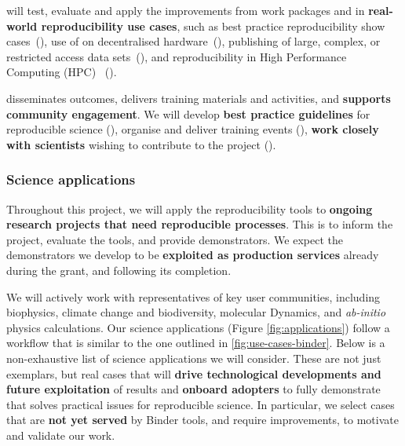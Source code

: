  will test, evaluate and apply the improvements from
work packages  and  in \textbf{real-world
reproducibility use cases}, such as best practice reproducibility show
cases~(), use of \repotodocker{} on
decentralised hardware~(), publishing
of large, complex, or restricted access data
sets~(), and reproducibility in High Performance Computing (HPC)~
().

 disseminates outcomes, delivers training materials
and activities, and \textbf{supports community engagement}. We will develop \textbf{best practice guidelines} for reproducible
science (), organise and deliver
training events (), \textbf{work closely with
scientists} wishing to contribute to the project ().

\subsubsection{Science applications}\label{sec:science-applications}

Throughout this project, we will apply the reproducibility tools to \textbf{ongoing
research projects that need reproducible processes}. This is to inform the
project, evaluate the tools, and provide demonstrators. We expect the
demonstrators we develop to be \textbf{exploited as production services} already during
the grant, and following its completion.

We will actively work with representatives of key user communities, including biophysics,
climate change and biodiversity, molecular Dynamics, and \emph{ab-initio} physics calculations.
Our science applications (Figure \ref{fig:applications}) follow a workflow that is similar to the one
outlined in \ref{fig:use-cases-binder}.
Below is a non-exhaustive list of science applications we will consider. These are not just exemplars, but
real cases that will \textbf{drive technological developments and future exploitation} of \TheProject results
 and \textbf{onboard adopters} to fully demonstrate that \TheProject
solves practical issues for reproducible science.
In particular, we select cases that are \textbf{not yet served} by Binder tools,
and require improvements,
to motivate and validate our work.

